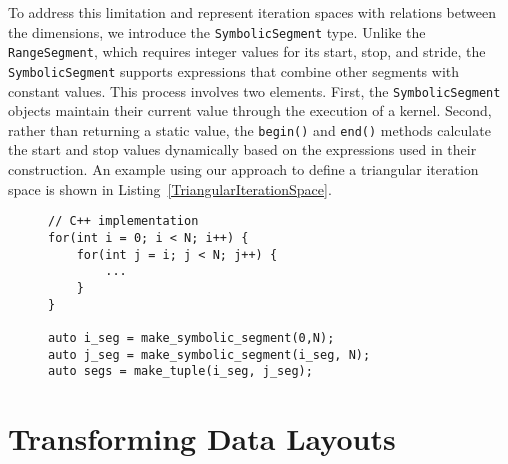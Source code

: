 
To address this limitation and represent iteration spaces with relations between the dimensions, we introduce the \verb.SymbolicSegment. type. 
Unlike the \verb.RangeSegment., which requires integer values for its start, stop, and stride, the \verb.SymbolicSegment. supports expressions that combine other segments with constant values. 
This process involves two elements.
First, the \verb.SymbolicSegment. objects maintain their current value through the execution of a kernel. 
Second, rather than returning a static value, the \verb.begin(). and \verb.end(). methods calculate the start and stop values dynamically based on the expressions used in their construction. 
An example using our approach to define a triangular iteration space is shown in Listing~\ref{TriangularIterationSpace}.

\begin{figure}
	\begin{lstlisting}[caption={An example of a loop with a triangular iteration space, expressed in C++ and using our SymbolicSegments.},label={TriangularIterationSpace}]
// C++ implementation
for(int i = 0; i < N; i++) {
	for(int j = i; j < N; j++) {
		...
	}
}

auto i_seg = make_symbolic_segment(0,N);
auto j_seg = make_symbolic_segment(i_seg, N);
auto segs = make_tuple(i_seg, j_seg);

	\end{lstlisting}

\end{figure}

\section{Transforming Data Layouts}



